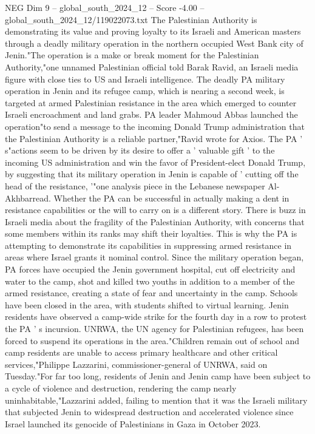 \begin{textsample}{NEG Dim 9 – global\_south\_2024\_12 – Score -4.00 – global\_south\_2024\_12/119022073.txt}  \label{ex:f9_neg_127}
The Palestinian Authority is demonstrating its value and proving loyalty to its Israeli and American masters through a deadly military operation in the northern occupied West Bank city of Jenin."The operation is a make or break moment for the Palestinian Authority,"one unnamed Palestinian official told Barak Ravid, an Israeli media figure with close ties to US and Israeli intelligence.
The deadly PA military operation in Jenin and its refugee camp, which is nearing a second week, is targeted at armed Palestinian resistance in the area which emerged to counter Israeli encroachment and land grabs.
PA leader Mahmoud Abbas launched the operation"to send a message to the incoming Donald Trump administration that the Palestinian Authority is a reliable partner,"Ravid wrote for Axios.
The PA ' s"actions seem to be driven by its desire to offer a ' valuable gift ' to the incoming US administration and win the favor of President-elect Donald Trump, by suggesting that its military operation in Jenin is capable of ' cutting off the head of the resistance, '"one analysis piece in the Lebanese newspaper Al-Akhbarread.
Whether the PA can be successful in actually making a dent in resistance capabilities or the will to carry on is a different story.
There is buzz in Israeli media about the fragility of the Palestinian Authority, with concerns that some members within its ranks may shift their loyalties.
This is why the PA is attempting to demonstrate its capabilities in suppressing armed resistance in areas where Israel grants it nominal control.
Since the military operation began, PA forces have occupied the Jenin government hospital, cut off electricity and water to the camp, shot and killed two youths in addition to a member of the armed resistance, creating a state of fear and uncertainty in the camp.
Schools have been closed in the area, with students shifted to virtual learning.
Jenin residents have observed a camp-wide strike for the fourth day in a row to protest the PA ' s incursion.
UNRWA, the UN agency for Palestinian refugees, has been forced to suspend its operations in the area."Children remain out of school and camp residents are unable to access primary healthcare and other critical services,"Philippe Lazzarini, commissioner-general of UNRWA, said on Tuesday."For far too long, residents of Jenin and Jenin camp have been subject to a cycle of violence and destruction, rendering the camp nearly uninhabitable,"Lazzarini added, failing to mention that it was the Israeli military that subjected Jenin to widespread destruction and accelerated violence since Israel launched its genocide of Palestinians in Gaza in October 2023.

\end{textsample}
